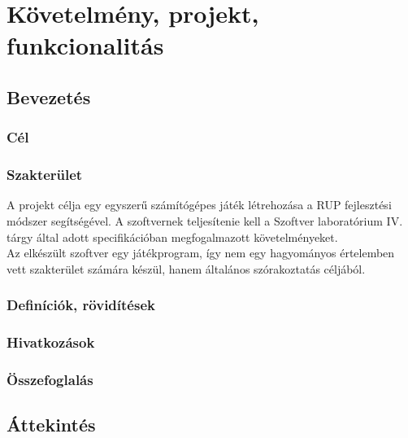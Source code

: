 
\chapter{Követelmény, projekt, funkcionalitás}

\thispagestyle{fancy}

\section{Bevezetés}

\subsection{Cél}

\subsection{Szakterület}
A projekt célja egy egyszerű számítógépes játék létrehozása a RUP fejlesztési módszer segítségével. A szoftvernek teljesítenie kell a Szoftver laboratórium IV. tárgy által adott specifikációban megfogalmazott követelményeket. \\ 
Az elkészült szoftver egy játékprogram, így nem egy hagyományos értelemben vett szakterület számára készül, hanem általános szórakoztatás céljából.

\subsection{Definíciók, rövidítések}

\subsection{Hivatkozások}

\subsection{Összefoglalás}

\section{Áttekintés}

